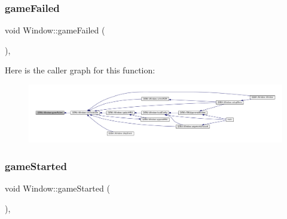 \subsubsection{\texorpdfstring{game\+Failed}{gameFailed}}
{\footnotesize\ttfamily void Window\+::game\+Failed (\begin{DoxyParamCaption}{ }\end{DoxyParamCaption})\hspace{0.3cm}{\ttfamily [private]}, {\ttfamily [slot]}}

Here is the caller graph for this function\+:
\nopagebreak
\begin{figure}[H]
\begin{center}
\leavevmode
\includegraphics[width=350pt]{class_q_g_b_a_1_1_window_a0dab910499bdba9274abdb3dfeb699f1_icgraph}
\end{center}
\end{figure}
\mbox{\label{class_q_g_b_a_1_1_window_a6260cb425f1ee6f8f808eaa195a0557f}} 
\subsubsection{\texorpdfstring{game\+Started}{gameStarted}}
{\footnotesize\ttfamily void Window\+::game\+Started (\begin{DoxyParamCaption}{ }\end{DoxyParamCaption})\hspace{0.3cm}{\ttfamily [private]}, {\ttfamily [slot]}}

